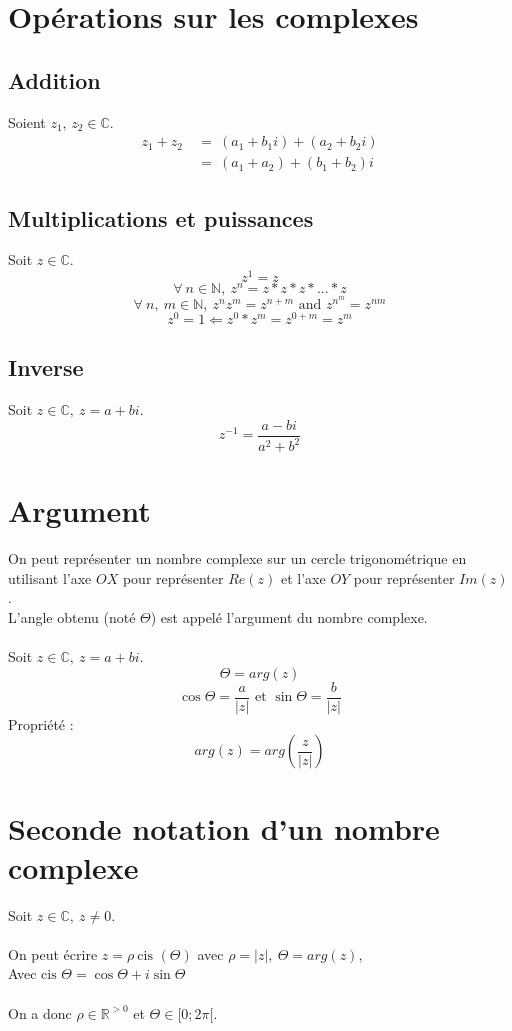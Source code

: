 \documentclass[]{article}
\newcommand{\cis}{\text{cis }}
\begin{document}
\section{Opérations sur les complexes}

\subsection{Addition}
\noindent
Soient $z_1$, $z_2 \in \mathbb{C}$.
\begin{align*}
z_1 + z_2 \ &= \ (a_1+b_1i)+(a_2+b_2i)
\\          &= \ (a_1+a_2)+(b_1+b_2)i
\end{align*}

\subsection{Multiplications et puissances}
\noindent
Soit $z \in \mathbb{C}$.
\\
\[
z^1 = z
\]
\[
\forall \ n \in \mathbb{N}, \ z^n = z*z*z*...*z
\]
\[
\forall \ n, \ m \in \mathbb{N}, \ z^n z^m = z^{n+m} \text{ and } z^{n^m} = z^{nm}
\]
\[
z^0 = 1 \Leftarrow z^0 * z^m = z^{0+m} = z^m
\]

\subsection{Inverse}
\noindent
Soit $z \in \mathbb{C}, \ z = a+bi$.
\\
\[
z^{-1} = \frac{a-bi}{a^2+b^2}
\]


\section{Argument}
\noindent
On peut représenter un nombre complexe sur un cercle trigonométrique en utilisant l'axe $OX$ pour représenter $Re(z)$ et l'axe $OY$ pour représenter $Im(z)$.
\\ L'angle obtenu (noté $\Theta$) est appelé l'argument du nombre complexe.
\\
\\ Soit $z \in \mathbb{C}, \ z = a+bi$.
\\
\[
\Theta = arg(z)
\]
\[
\cos{\Theta} = \frac{a}{|z|} \text{ et } \sin{\Theta} = \frac{b}{|z|}
\]
Propriété :
\\
\[
arg(z) = arg\left(\frac{z}{|z|}\right)
\]


\section{Seconde notation d'un nombre complexe}
\noindent
Soit $z \in \mathbb{C}, \ z \neq 0$.
\\
\\ On peut écrire $z = \rho \ \cis (\Theta)$ avec $\rho = |z|, \ \Theta = arg(z)$,
\\ Avec $\cis{\Theta} = \cos{\Theta} + i \sin{\Theta}$
\\
\\ On a donc $\rho \in \mathbb{R}^{>0}$ et $\Theta \in [0; 2 \pi[$.
\end{document}
